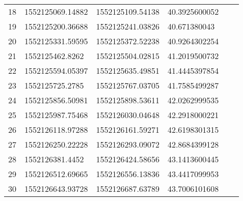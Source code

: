 \begin{landscape}
\begin{longtable}{l|l|l|l|ll}
18 & 1552125069.14882 & 1552125109.54138 & 40.3925600052 &  &  \\
19 & 1552125200.36688 & 1552125241.03826 & 40.671380043 &  &  \\
20 & 1552125331.59595 & 1552125372.52238 & 40.9264302254 &  &  \\
21 & 1552125462.8262 & 1552125504.02815 & 41.2019500732 &  &  \\
22 & 1552125594.05397 & 1552125635.49851 & 41.4445397854 &  &  \\
23 & 1552125725.2785 & 1552125767.03705 & 41.7585499287 &  &  \\
24 & 1552125856.50981 & 1552125898.53611 & 42.0262999535 &  &  \\
25 & 1552125987.75468 & 1552126030.04648 & 42.2918000221 &  &  \\
26 & 1552126118.97288 & 1552126161.59271 & 42.6198301315 &  &  \\
27 & 1552126250.22228 & 1552126293.09072 & 42.8684399128 &  &  \\
28 & 1552126381.4452 & 1552126424.58656 & 43.1413600445 &  &  \\
29 & 1552126512.69665 & 1552126556.13836 & 43.4417099953 &  &  \\
30 & 1552126643.93728 & 1552126687.63789 & 43.7006101608 &  & 
\end{longtable}  
\end{landscape}

